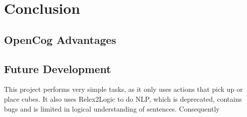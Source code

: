 \chapter{Conclusion} \label{cha:conclusion}


\section{OpenCog Advantages}\label{sec:opencog advantages}


\section{Future Development}\label{sec:future_devel}

This project performs very simple tasks, as it only uses actions that pick up or place cubes. 
It also uses Relex2Logic to do NLP, which is deprecated, contains bugs and is limited in logical understanding of sentences.
Consequently 